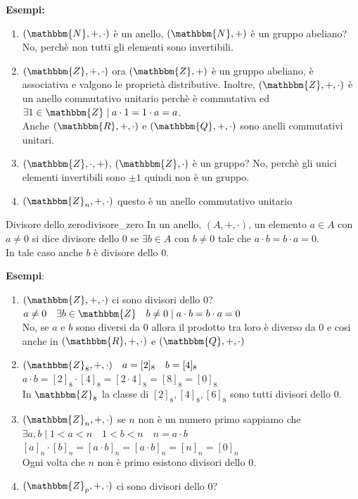 \documentclass[12pt, letterpaper]{report}
\newcounter{definition}
\newcommand{\nmu}{}
\begin{document}
 		\textbf{Esempi:}
 		\begin{enumerate}
 			\item $(\mathbbm{N}, +, \cdot)$ è un anello, $(\mathbbm{N}, +)$ è un gruppo abeliano? No, perchè non tutti gli elementi sono invertibili.
 			\item $(\mathbbm{Z}, +, \cdot)$ ora $(\mathbbm{Z}, +)$ è un gruppo abeliano, è associativa e valgono le proprietà distributive. Inoltre, $(\mathbbm{Z}, +, \cdot)$ è un anello commutativo unitario perchè è commutativa ed $\exists 1 \in \mathbbm{Z} \mid a \cdot 1 = 1 \cdot a = a$. \\
 			Anche $(\mathbbm{R}, +, \cdot)$ e $(\mathbbm{Q}, +, \cdot)$ sono anelli commutativi unitari.
 			\item $(\mathbbm{Z}, \cdot, +)$, $(\mathbbm{Z}, \cdot)$ è un gruppo? No, perchè gli unici elementi invertibili sono $\pm 1$ quindi non è un gruppo.
 			\item $(\mathbbm{Z}_n, +, \cdot)$ questo è un anello commutativo unitario
 		\end{enumerate}
 		 \begin{definition}{\nmu Divisore dello zero}{divisore_zero}
 			In un anello, $(A, +, \cdot)$, un elemento $a \in A$ con $a \neq 0$ si dice divisore dello 0 se $\exists b \in A$ con $b \neq 0$ tale che $a \cdot b = b \cdot a = 0$. \\
 			In tale caso anche $b$ è divisore dello 0.
 		\end{definition}
 		\textbf{Esempi}:
 		\begin{enumerate}
 			\item $(\mathbbm{Z}, +, \cdot)$ ci sono divisori dello 0? \\
 			$a \neq 0 \quad \exists b \in \mathbbm{Z} \quad b \neq 0 \mid a \cdot b = b \cdot a = 0$ \\
 			No, se $a$ e $b$ sono diversi da 0 allora il prodotto tra loro è diverso da 0 e cosi anche in $(\mathbbm{R}, +, \cdot)$ e $(\mathbbm{Q}, +, \cdot)$
 			\item $(\mathbbm{Z}_8, +, \cdot) \quad a=[2]_8 \quad b=[4]_8$ \\
 			$a \cdot b = [2]_8 \cdot [4]_8 = [2 \cdot 4]_8 = [8]_8 = [0]_8$ \\
 			In $\mathbbm{Z}_8$ la classe di $[2]_8, [4]_8, [6]_8$ sono tutti divisori dello 0.
 			\item $(\mathbbm{Z}_n, +, \cdot)$ se $n$ non è un numero primo sappiamo che $\exists a, b \mid 1 < a < n \quad 1<b<n \quad n = a \cdot b$ \\
 			$[a]_n \cdot [b]_n = [a \cdot b]_n = [a \cdot b]_n = [n]_n = [0]_n$ \\
 			Ogni volta che $n$ non è primo esistono divisori dello 0. \\
 			\item $(\mathbbm{Z}_p, +, \cdot)$ ci sono divisori dello 0?
 		\end{enumerate}
\end{document}
